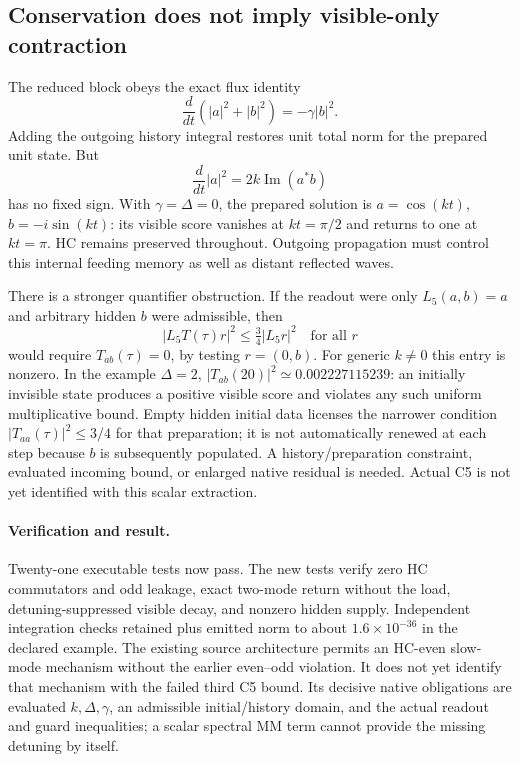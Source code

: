 \documentclass[11pt,a4paper]{article}
\begin{document}
\subsection{Conservation does not imply visible-only contraction}

The reduced block obeys the exact flux identity
\[
 \frac{d}{dt}(|a|^2+|b|^2)=-\gamma|b|^2.
\]
Adding the outgoing history integral restores unit total norm
for the prepared unit state. But
\[
 \frac{d}{dt}|a|^2=2k\operatorname{Im}(a^*b)
\]
has no fixed sign. With $\gamma=\Delta=0$, the prepared solution
is $a=\cos(kt)$, $b=-i\sin(kt)$: its visible score vanishes at
$kt=\pi/2$ and returns to one at $kt=\pi$. HC remains preserved
throughout. Outgoing propagation must control this internal
feeding memory as well as distant reflected waves.

There is a stronger quantifier obstruction. If the readout were
only $L_5(a,b)=a$ and arbitrary hidden $b$ were admissible, then
\[
 |L_5 T(\tau)r|^2\leq\tfrac34|L_5 r|^2
 \quad\text{for all }r
\]
would require $T_{ab}(\tau)=0$, by testing $r=(0,b)$.
For generic $k\ne0$ this entry is nonzero. In the example
$\Delta=2$, $|T_{ab}(20)|^2\simeq0.002227115239$:
an initially invisible state produces a positive visible score
and violates any such uniform multiplicative bound. Empty hidden
initial data licenses the narrower condition
$|T_{aa}(\tau)|^2\leq3/4$ for that preparation; it is not
automatically renewed at each step because $b$ is subsequently
populated. A history/preparation constraint, evaluated incoming
bound, or enlarged native residual is needed. Actual C5 is not
yet identified with this scalar extraction.

\paragraph{Verification and result.}
Twenty-one executable tests now pass. The new tests verify zero
HC commutators and odd leakage, exact two-mode return without
the load, detuning-suppressed visible decay, and nonzero hidden
supply. Independent integration checks retained plus emitted
norm to about $1.6\times10^{-36}$ in the declared example.
The existing source architecture permits an HC-even slow-mode
mechanism without the earlier even--odd violation. It does not
yet identify that mechanism with the failed third C5 bound.
Its decisive native obligations are evaluated $k,\Delta,\gamma$,
an admissible initial/history domain, and the actual readout and
guard inequalities; a scalar spectral MM term cannot provide
the missing detuning by itself.
\end{document}
